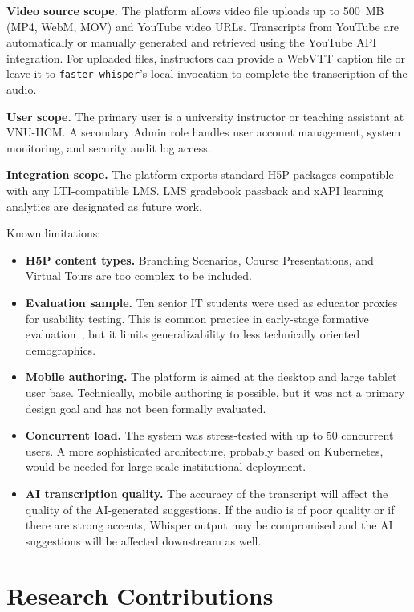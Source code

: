 \textbf{Video source scope.} The platform allows video file uploads up to 500~MB (MP4, WebM, MOV) and YouTube video URLs. Transcripts from YouTube are automatically or manually generated and retrieved using the YouTube API integration. For uploaded files, instructors can provide a WebVTT caption file or leave it to \texttt{faster-whisper}'s local invocation to complete the transcription of the audio.

\textbf{User scope.} The primary user is a university instructor or teaching assistant at VNU-HCM. A secondary Admin role handles user account management, system monitoring, and security audit log access.

\textbf{Integration scope.} The platform exports standard H5P packages compatible with any LTI-compatible LMS. LMS gradebook passback and xAPI learning analytics are designated as future work.

Known limitations:

\begin{itemize}
  \item \textbf{H5P content types.} Branching Scenarios, Course Presentations, and Virtual Tours are too complex to be included.
  \item \textbf{Evaluation sample.} Ten senior IT students were used as educator proxies for usability testing. This is common practice in early-stage formative evaluation~\cite{nielsen1994}, but it limits generalizability to less technically oriented demographics.
  \item \textbf{Mobile authoring.} The platform is aimed at the desktop and large tablet user base. Technically, mobile authoring is possible, but it was not a primary design goal and has not been formally evaluated.
  \item \textbf{Concurrent load.} The system was stress-tested with up to 50 concurrent users. A more sophisticated architecture, probably based on Kubernetes, would be needed for large-scale institutional deployment.
  \item \textbf{AI transcription quality.} The accuracy of the transcript will affect the quality of the AI-generated suggestions. If the audio is of poor quality or if there are strong accents, Whisper output may be compromised and the AI suggestions will be affected downstream as well.
\end{itemize}

\section{Research Contributions}

